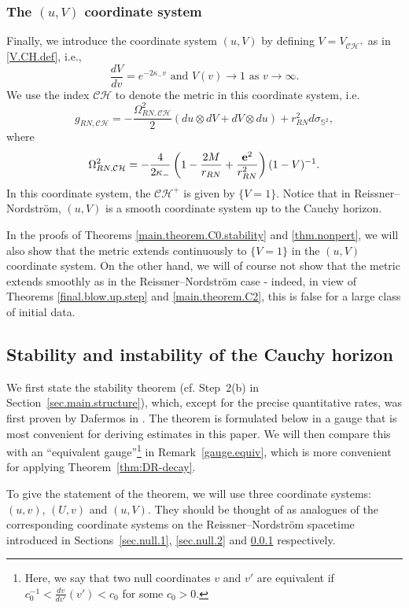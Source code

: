 \documentclass[10pt, reqno]{amsart}
\theoremstyle{definition}
\theoremstyle{remark}
\numberwithin{equation}{section}
\newcommand{\0}{\emptyset}
\newcommand{\kpp}{\kappa}
\newcommand{\Omg}{\Omega}
\newcommand{\calC}{\mathcal C}
\newcommand{\calH}{\mathcal H}
\newcommand{\f}{\frac}
\newcommand{\CH}{\calC \calH^{+}}		%
\begin{document}
\subsubsection{The $(u,V)$ coordinate system}\label{sec.null.3}
Finally, we introduce the coordinate system $(u,V)$ by defining $V=V_{\CH}$ as in \eqref{V.CH.def}, i.e.,  
\begin{equation}\label{V.def}
\f{dV}{dv}=e^{-2\kappa_- v}\mbox{ and }V(v)\to 1\mbox{ as }v\to \infty.
\end{equation}
We use the index $\mathcal C\mathcal H$ to denote the metric in this coordinate system, i.e.
$$g_{RN,\mathcal C\mathcal H}=-\f{\Omg_{RN,\mathcal C\mathcal H}^2}{2} (du\otimes dV+dV\otimes du)+ r_{RN}^2 d\sigma_{\mathbb S^2},$$
where 
$$\Omg_{RN,\mathcal C\mathcal H}^2=-\frac{4}{2 \kpp_{-}}\left(1-\f{2M}{r_{RN}}+\f{{\bf e}^2}{r_{RN}^2}\right) (1-V)^{-1}.$$ 
In this coordinate system, the $\CH$ is given by $\{V=1\}$. Notice that in Reissner--Nordstr\"om, $(u,V)$ is a smooth coordinate system up to the Cauchy horizon.

In the proofs of Theorems \ref{main.theorem.C0.stability} and \ref{thm.nonpert}, we will also show that the metric extends continuously to $\{V=1\}$ in the $(u,V)$ coordinate system. On the other hand, we will of course not show that the metric extends smoothly as in the Reissner--Nordstr\"om case - indeed, in view of Theorems \ref{final.blow.up.step} and \ref{main.theorem.C2}, this is false for a large class of initial data.

\subsection{Stability and instability of the Cauchy horizon}

We first state the stability theorem (cf. Step~2(b) in Section~\ref{sec.main.structure}), which, except for the precise quantitative rates, was first proven by Dafermos in \cite{D2}. The theorem is formulated below in a gauge that is most convenient for deriving estimates in this paper. We will then compare this with an ``equivalent gauge''\footnote{Here, we say that two null coordinates $v$ and $v'$ are equivalent if $c_0^{-1}<\f{dv}{dv'}(v')<c_0$ for some $c_0>0$.} in Remark~\ref{gauge.equiv}, which is more convenient for applying Theorem~\ref{thm:DR-decay}. 

To give the statement of the theorem, we will use three coordinate systems: $(u,v)$, $(U,v)$ and $(u,V)$. They should be thought of as analogues of the corresponding coordinate systems on the Reissner--Nordstr\"om spacetime introduced in Sections~\ref{sec.null.1}, \ref{sec.null.2} and \ref{sec.null.3} respectively.
\end{document}
